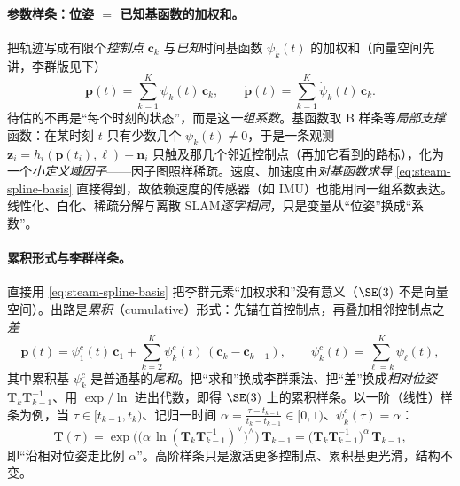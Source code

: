 \paragraph{参数样条：位姿 $=$ 已知基函数的加权和。}
把轨迹写成有限个\emph{控制点} $\mathbf{c}_k$ 与\emph{已知}时间基函数 $\psi_k(t)$ 的加权和\cite{carlone2026handbook}（向量空间先讲，李群版见下）
\begin{equation}
  \mathbf{p}(t)=\sum_{k=1}^{K}\psi_k(t)\,\mathbf{c}_k,\qquad
  \dot{\mathbf{p}}(t)=\sum_{k=1}^{K}\dot{\psi}_k(t)\,\mathbf{c}_k .
  \label{eq:steam-spline-basis}
\end{equation}
待估的不再是“每个时刻的状态”，而是这\emph{一组系数}。基函数取 B 样条等\emph{局部支撑}函数：在某时刻 $t$ 只有少数几个 $\psi_k(t)\ne0$，于是一条观测 $\mathbf{z}_i=h_i(\mathbf{p}(t_i),\boldsymbol{\ell})+\mathbf{n}_i$ 只触及那几个邻近控制点（再加它看到的路标），化为一个\emph{小定义域因子}——因子图照样稀疏。速度、加速度由\emph{对基函数求导} \cref{eq:steam-spline-basis} 直接得到，故依赖速度的传感器（如 IMU）也能用同一组系数表达。线性化、白化、稀疏分解与离散 SLAM\emph{逐字相同}，只是变量从“位姿”换成“系数”。

\paragraph{累积形式与李群样条。}
直接用 \cref{eq:steam-spline-basis} 把李群元素“加权求和”没有意义（$\SE(3)$ 不是向量空间）。出路是\emph{累积}（cumulative）形式：先锚在首控制点，再叠加相邻控制点之\emph{差}
\begin{equation}
  \mathbf{p}(t)=\psi_1^c(t)\,\mathbf{c}_1+\sum_{k=2}^{K}\psi_k^c(t)\,(\mathbf{c}_k-\mathbf{c}_{k-1}),
  \qquad \psi_k^c(t)=\sum_{\ell=k}^{K}\psi_\ell(t),
  \label{eq:steam-spline-cumul}
\end{equation}
其中累积基 $\psi_k^c$ 是普通基的\emph{尾和}。把“求和”换成李群乘法、把“差”换成\emph{相对位姿} $\mathbf{T}_k\mathbf{T}_{k-1}^{-1}$、用 $\exp/\ln$ 进出代数，即得 $\SE(3)$ 上的累积样条。以一阶（线性）样条为例，当 $\tau\in[t_{k-1},t_k)$、记归一时间 $\alpha=\tfrac{\tau-t_{k-1}}{t_k-t_{k-1}}\in[0,1)$、$\psi_k^c(\tau)=\alpha$：
\begin{equation}
  \mathbf{T}(\tau)=\exp\!\Big(\big(\alpha\,\ln(\mathbf{T}_k\mathbf{T}_{k-1}^{-1})^\vee\big)^{\wedge}\Big)\,\mathbf{T}_{k-1}
  =\big(\mathbf{T}_k\mathbf{T}_{k-1}^{-1}\big)^{\alpha}\,\mathbf{T}_{k-1},
  \label{eq:steam-spline-lie}
\end{equation}
即“沿相对位姿走比例 $\alpha$”。高阶样条只是激活更多控制点、累积基更光滑，结构不变。

